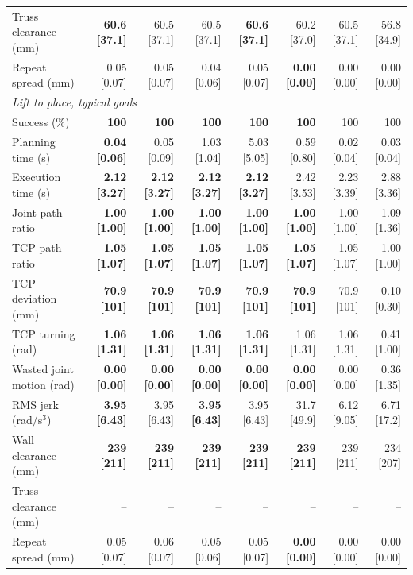 \begin{table}[t]
\begin{tabular}{lrrrrrrr}
Truss clearance (mm) & \textbf{60.6 [37.1]} & 60.5 [37.1] & 60.5 [37.1] & \textbf{60.6 [37.1]} & 60.2 [37.0] & 60.5 [37.1] & 56.8 [34.9] \\
Repeat spread (mm) & 0.05 [0.07] & 0.05 [0.07] & 0.04 [0.06] & 0.05 [0.07] & \textbf{0.00 [0.00]} & 0.00 [0.00] & 0.00 [0.00] \\
\midrule
\multicolumn{8}{l}{\emph{Lift to place, typical goals}} \\
Success (\%) & \textbf{100} & \textbf{100} & \textbf{100} & \textbf{100} & \textbf{100} & 100 & 100 \\
Planning time (s) & \textbf{0.04 [0.06]} & 0.05 [0.09] & 1.03 [1.04] & 5.03 [5.05] & 0.59 [0.80] & 0.02 [0.04] & 0.03 [0.04] \\
Execution time (s) & \textbf{2.12 [3.27]} & \textbf{2.12 [3.27]} & \textbf{2.12 [3.27]} & \textbf{2.12 [3.27]} & 2.42 [3.53] & 2.23 [3.39] & 2.88 [3.36] \\
Joint path ratio & \textbf{1.00 [1.00]} & \textbf{1.00 [1.00]} & \textbf{1.00 [1.00]} & \textbf{1.00 [1.00]} & \textbf{1.00 [1.00]} & 1.00 [1.00] & 1.09 [1.36] \\
TCP path ratio & \textbf{1.05 [1.07]} & \textbf{1.05 [1.07]} & \textbf{1.05 [1.07]} & \textbf{1.05 [1.07]} & \textbf{1.05 [1.07]} & 1.05 [1.07] & 1.00 [1.00] \\
TCP deviation (mm) & \textbf{70.9 [101]} & \textbf{70.9 [101]} & \textbf{70.9 [101]} & \textbf{70.9 [101]} & \textbf{70.9 [101]} & 70.9 [101] & 0.10 [0.30] \\
TCP turning (rad) & \textbf{1.06 [1.31]} & \textbf{1.06 [1.31]} & \textbf{1.06 [1.31]} & \textbf{1.06 [1.31]} & 1.06 [1.31] & 1.06 [1.31] & 0.41 [1.00] \\
Wasted joint motion (rad) & \textbf{0.00 [0.00]} & \textbf{0.00 [0.00]} & \textbf{0.00 [0.00]} & \textbf{0.00 [0.00]} & \textbf{0.00 [0.00]} & 0.00 [0.00] & 0.36 [1.35] \\
RMS jerk (rad/s$^3$) & \textbf{3.95 [6.43]} & 3.95 [6.43] & \textbf{3.95 [6.43]} & 3.95 [6.43] & 31.7 [49.9] & 6.12 [9.05] & 6.71 [17.2] \\
Wall clearance (mm) & \textbf{239 [211]} & \textbf{239 [211]} & \textbf{239 [211]} & \textbf{239 [211]} & \textbf{239 [211]} & 239 [211] & 234 [207] \\
Truss clearance (mm) & -- & -- & -- & -- & -- & -- & -- \\
Repeat spread (mm) & 0.05 [0.07] & 0.06 [0.07] & 0.05 [0.06] & 0.05 [0.07] & \textbf{0.00 [0.00]} & 0.00 [0.00] & 0.00 [0.00] \\

\end{tabular}
\end{table}

